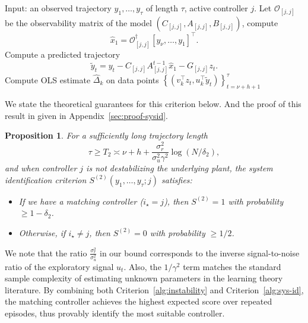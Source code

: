 \documentclass[11pt, twoside]{article}
\makeatletter
\newcounter{criteria}
\renewcommand{\thecriteria}{\arabic{criteria}}
\newenvironment{algcriteria}[1][htb]{\renewcommand{\ALG@name}{Criterion}\renewcommand{\thealgorithm}{\thecriteria}\refstepcounter{criteria}\begin{algorithm}[#1]}{\end{algorithm}}
\newtheorem{proposition}[theorem]{Proposition}
\theoremstyle{definition}
\makeatother
\begin{document}
\begin{algcriteria}
\begin{algorithmic}[1]
    \State Input: an observed trajectory $y_1, \dots, y_\tau$ of length $\tau$, active controller $j$.
    \State Let $\mathcal{O}_{[j,j]}$ be the observability matrix of the model $(C_{[j,j]}, A_{[j,j]}, B_{[j,j]})$, compute
    \[\hat{x}_1 = \mathcal{O}_{[j,j]}^\dagger [y_\nu, \dots, y_1]^\top.\]
    \State Compute a predicted trajectory
    \[\widetilde{y}_{t} = y_t - C_{[j,j]} A_{[j,j]}^{t-1} \hat{x}_1 - G_{[j,j]} z_t.\]
    \State Compute OLS estimate $\widehat{\Delta}_k$ on data points $\left\{(v_k^\top z_t, u_k^\top \widetilde{y}_t)\right\}_{t=\nu+h+1}^\tau$
     
    \EndIf
    \EndFor
    \State {}
\end{algorithmic}
\caption{System identification criterion $S^{(2)}$}
\label{alg:sys-id}
\end{algcriteria}

We state the theoretical guarantees for this criterion below.
And the proof of this result in given in Appendix~\ref{sec:proof-sysid}.

\begin{proposition}
\label{thm:sys-id}
    For a sufficiently long trajectory length
    \[\tau \ge T_2 \asymp \nu + h + \frac{\sigma_r^2}{\sigma_u^2 \gamma^2} \log(N / \delta_2),\]
    and when controller $j$ is not destabilizing the underlying plant, the system identification criterion $S^{(2)}(y_1, \dots, y_\tau; j)$ satisfies:
    \begin{itemize}[wide, labelindent=3pt]
    \item If we have a matching controller ($i_\star = j$), then $S^{(2)} = 1$ with probability $\ge 1 - \delta_2$.
    \item Otherwise, if $i_\star \neq j$, then $S^{(2)} = 0$ with probability $\ge 1/2$.
    \end{itemize}
\end{proposition}

We note that the ratio $\frac{\sigma_r^2}{\sigma_u^2}$ in our bound corresponds to the inverse signal-to-noise ratio of the exploratory signal $u_t$.
Also, the $1/\gamma^2$ term matches the standard sample complexity of estimating unknown parameters in the learning theory literature.
By combining both Criterion~\ref{alg:instability} and Criterion~\ref{alg:sys-id}, the matching controller achieves the highest expected score over repeated episodes, thus provably identify the most suitable controller.
\end{document}
